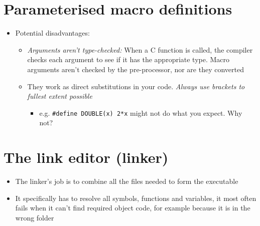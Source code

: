 \documentclass{article}
\begin{document}
\section{Parameterised macro definitions}
\begin{itemize}
\item Potential disadvantages:
\begin{itemize}
\item \emph{Arguments aren't type-checked:}
When a C function is called, the compiler checks each argument to see if it has the appropriate type. Macro arguments aren't checked by the pre-processor, nor are they converted
\item They work as direct substitutions in your code. \emph{Always use brackets to fullest extent possible}
\begin{itemize}
\item e.g. \verb!#define DOUBLE(x) 2*x!  might not do what you expect. Why not?
\end{itemize}
\end{itemize}
\end{itemize}




\section{The link editor (linker)}
\begin{center}
\end{center}
\begin{itemize}
\item The linker's job is to combine all the files needed to form the executable

\item It specifically has to resolve all symbols, functions and variables, it most often fails when it can't find required object code, for example because it is in the wrong folder
\end{itemize}
\end{document}
